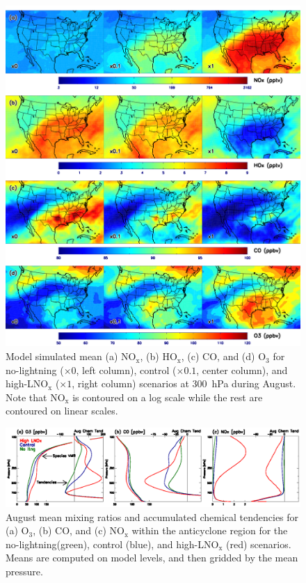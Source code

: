  \begin{figure}
 \noindent\includegraphics[width=40pc]{figures/ltngsens_map.png}
 \caption{Model simulated mean (a) NO$_{\mathrm{x}}$, (b) HO$_{\mathrm{x}}$,
(c) CO, and (d) O$_3$ for no-lightning ($\times0$, left column), control ($\times0.1$, center
column), and high-LNO$_{\mathrm{x}}$ ($\times1$, right column) scenarios at 300~hPa
during August. Note that NO$_{\mathrm{x}}$ is contoured on a log scale
while the rest are contoured on linear scales.}
 \label{fig:ltng_map}
 \end{figure}

 \begin{figure}
 \noindent\includegraphics[width=40pc]{figures/ltngsens_vert.eps}
 \caption{August mean mixing ratios and accumulated chemical tendencies
for (a) O$_3$, (b) CO, and (c) NO$_{\mathrm{x}}$ within the anticyclone
region for the no-lightning(green), control (blue),
and high-LNO$_{\mathrm{x}}$ (red) scenarios. Means are computed on model levels, and then
gridded by the mean pressure.}
 \label{fig:ltng_vert}
 \end{figure}

